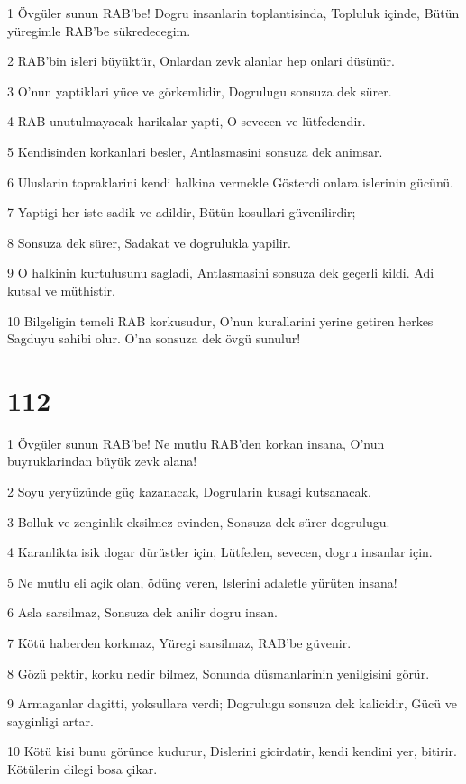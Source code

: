 \par 1 Övgüler sunun RAB'be! Dogru insanlarin toplantisinda, Topluluk içinde, Bütün yüregimle RAB'be sükredecegim.
\par 2 RAB'bin isleri büyüktür, Onlardan zevk alanlar hep onlari düsünür.
\par 3 O'nun yaptiklari yüce ve görkemlidir, Dogrulugu sonsuza dek sürer.
\par 4 RAB unutulmayacak harikalar yapti, O sevecen ve lütfedendir.
\par 5 Kendisinden korkanlari besler, Antlasmasini sonsuza dek animsar.
\par 6 Uluslarin topraklarini kendi halkina vermekle Gösterdi onlara islerinin gücünü.
\par 7 Yaptigi her iste sadik ve adildir, Bütün kosullari güvenilirdir;
\par 8 Sonsuza dek sürer, Sadakat ve dogrulukla yapilir.
\par 9 O halkinin kurtulusunu sagladi, Antlasmasini sonsuza dek geçerli kildi. Adi kutsal ve müthistir.
\par 10 Bilgeligin temeli RAB korkusudur, O'nun kurallarini yerine getiren herkes Sagduyu sahibi olur. O'na sonsuza dek övgü sunulur!

\chapter{112}

\par 1 Övgüler sunun RAB'be! Ne mutlu RAB'den korkan insana, O'nun buyruklarindan büyük zevk alana!
\par 2 Soyu yeryüzünde güç kazanacak, Dogrularin kusagi kutsanacak.
\par 3 Bolluk ve zenginlik eksilmez evinden, Sonsuza dek sürer dogrulugu.
\par 4 Karanlikta isik dogar dürüstler için, Lütfeden, sevecen, dogru insanlar için.
\par 5 Ne mutlu eli açik olan, ödünç veren, Islerini adaletle yürüten insana!
\par 6 Asla sarsilmaz, Sonsuza dek anilir dogru insan.
\par 7 Kötü haberden korkmaz, Yüregi sarsilmaz, RAB'be güvenir.
\par 8 Gözü pektir, korku nedir bilmez, Sonunda düsmanlarinin yenilgisini görür.
\par 9 Armaganlar dagitti, yoksullara verdi; Dogrulugu sonsuza dek kalicidir, Gücü ve sayginligi artar.
\par 10 Kötü kisi bunu görünce kudurur, Dislerini gicirdatir, kendi kendini yer, bitirir. Kötülerin dilegi bosa çikar.

